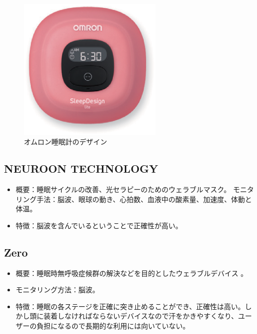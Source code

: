\begin{figure}[htbp]
\begin{center}
\includegraphics[width=7cm]{eps/omuron.eps}
\caption{オムロン睡眠計のデザイン}
\label{omuron}
\end{center}
\end{figure}

\subsection{NEUROON TECHNOLOGY}
\begin{itemize}
\item 概要：睡眠サイクルの改善、光セラピーのためのウェラブルマスク。
モニタリング手法：脳波、眼球の動き、心拍数、血液中の酸素量、加速度、体動と体温。 \cite{neuroon}
\item 特徴：脳波を含んでいるということで正確性が高い。
\end{itemize}

\subsection{Zero}
\begin{itemize}
\item 概要：睡眠時無呼吸症候群の解決などを目的としたウェラブルデバイス \cite{beWellApp}。
\item モニタリング方法：脳波。
\item 特徴：睡眠の各ステージを正確に突き止めることができ、正確性は高い。しかし頭に装着しなければならないデバイスなので汗をかきやすくなり、ユーザーの負担になるので長期的な利用には向いていない。
\end{itemize}

